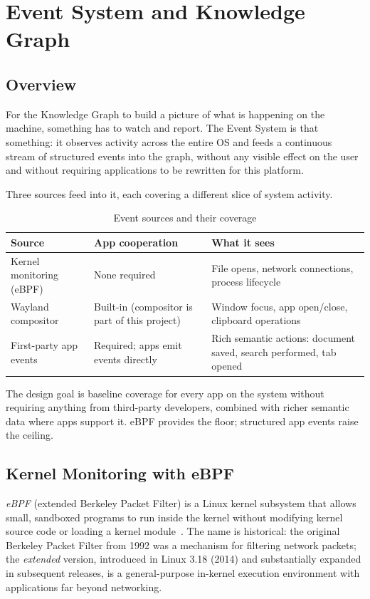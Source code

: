 \section{Event System and Knowledge Graph}
\label{sec:event-knowledge}

\subsection{Overview}
\label{sec:event-overview}

For the Knowledge Graph to build a picture of what is happening on the machine,
something has to watch and report. The Event System is that something: it
observes activity across the entire OS and feeds a continuous stream of
structured events into the graph, without any visible effect on the user and
without requiring applications to be rewritten for this platform.

Three sources feed into it, each covering a different slice of system activity.

\begin{table}[htbp]
\caption{Event sources and their coverage}
\label{tab:event-sources}
\begin{tabularx}{\linewidth}{lXX}
\toprule
\textbf{Source} & \textbf{App cooperation} & \textbf{What it sees} \\
\midrule
Kernel monitoring (eBPF) &
  None required &
  File opens, network connections, process lifecycle \\
Wayland compositor &
  Built-in (compositor is part of this project) &
  Window focus, app open/close, clipboard operations \\
First-party app events &
  Required; apps emit events directly &
  Rich semantic actions: document saved, search performed, tab opened \\
\bottomrule
\end{tabularx}
\end{table}

The design goal is baseline coverage for every app on the system without
requiring anything from third-party developers, combined with richer semantic
data where apps support it. eBPF provides the floor; structured app events
raise the ceiling.

\subsection{Kernel Monitoring with eBPF}
\label{sec:ebpf}

\emph{eBPF} (extended Berkeley Packet Filter) is a Linux kernel subsystem that
allows small, sandboxed programs to run inside the kernel without modifying
kernel source code or loading a kernel module~\cite{ebpf:io}. The name is
historical: the original Berkeley Packet Filter from 1992 was a mechanism for
filtering network packets; the \emph{extended} version, introduced in Linux
3.18 (2014) and substantially expanded in subsequent releases, is a
general-purpose in-kernel execution environment with applications far beyond
networking.

